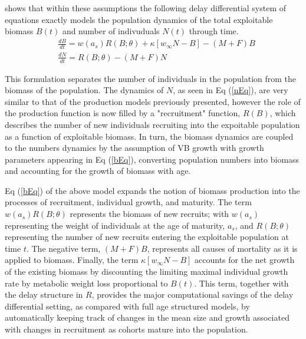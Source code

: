 %
 shows that within these assumptions the 
following delay differential system of equations exactly models the population 
dynamics of the total exploitable biomass $B(t)$ and number of indivuduals $N(t)$ 
through time.
%
\begin{align}%
&\frac{dB}{dt} = w(a_s)R(B;\theta) + \kappa \left[w_\infty N-B\right] - (M+F)B \label{bEq}\\
&\frac{dN}{dt} = R(B;\theta) - (M+F)N \label{nEq}
\end{align}

%
This formulation separates the number of individuals in the population from the 
biomass of the population. The dynamics of $N$, as seen in Eq (\ref{nEq}), are
very similar to that of the {\color{green}production models previously presented}, 
however the role of the production function is now filled by a "recruitment" 
function, $R(B)$, which describes the number of new individuals recruiting into the 
expoitable population as a function of exploitable biomass. In turn, the biomass 
dynamics are coupled to the numbers dynamics by the assumption of VB growth with 
growth parameters appearing in Eq (\ref{bEq}), converting population numbers 
into biomass and accounting for the growth of biomass with age. 

%
Eq (\ref{bEq}) of the above model expands the notion of biomass production into the 
processes of recruitment, individual growth, and maturity. The term $w(a_s)R(B;\theta)$
represents the biomass of new recruits; with $w(a_s)$ representing the weight of individuals 
at the age of maturity, $a_s$, and $R(B;\theta)$ representing the number of new recruits 
entering the exploitable population at time $t$. The negative term, $(M+F)B$, represents all 
causes of mortality as it is applied to biomass. Finally, the term $\kappa \left[w_\infty N-B\right]$ 
accounts for the net growth of the existing biomass by discounting the limiting maximal individual 
growth rate by metabolic weight loss proportional to $B(t)$. This term, together with the delay 
structure in $R$, provides the major computational savings of the delay differential setting, as 
compared with full age structured models, by automatically keeping track of changes in the mean 
size and growth associated with changes in recruitment as cohorts mature into the population.    

